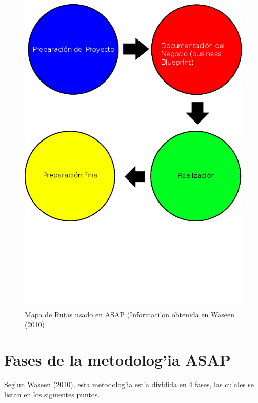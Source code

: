 \begin{figure}[H]
\centering
\includegraphics[scale=0.326,type=png,ext=.png,read=.png]{figures/RouteMap}
\caption{Mapa de Rutas usado en ASAP (Informaci'on obtenida en Waseen (2010) }
\label{fig:roadmap}
\end{figure}


\section{Fases de la metodolog'ia ASAP}
Seg'un Waseen (2010), esta metodolog'ia est'a dividida en 4 fases, las cu'ales se listan en los siguientes puntos.
